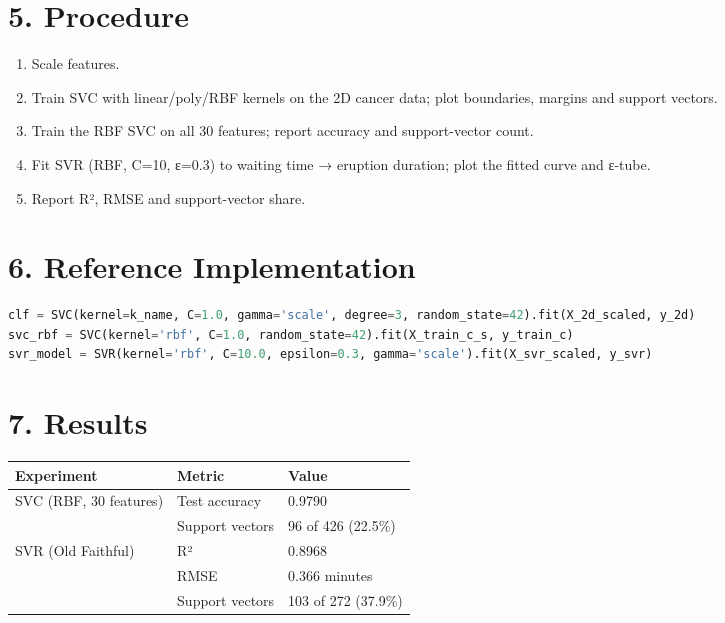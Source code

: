 \section{5. Procedure}\label{procedure}

\begin{enumerate}
\def\labelenumi{\arabic{enumi}.}
\tightlist
\item
  Scale features.
\item
  Train SVC with linear/poly/RBF kernels on the 2D cancer data; plot
  boundaries, margins and support vectors.
\item
  Train the RBF SVC on all 30 features; report accuracy and
  support-vector count.
\item
  Fit SVR (RBF, C=10, ε=0.3) to waiting time → eruption duration; plot
  the fitted curve and ε-tube.
\item
  Report R², RMSE and support-vector share.
\end{enumerate}

\section{6. Reference Implementation}\label{reference-implementation}

\begin{lstlisting}[language=Python]
clf = SVC(kernel=k_name, C=1.0, gamma='scale', degree=3, random_state=42).fit(X_2d_scaled, y_2d)
svc_rbf = SVC(kernel='rbf', C=1.0, random_state=42).fit(X_train_c_s, y_train_c)
svr_model = SVR(kernel='rbf', C=10.0, epsilon=0.3, gamma='scale').fit(X_svr_scaled, y_svr)
\end{lstlisting}

\section{7. Results}\label{results}

{\def\LTcaptype{none} %
\begin{longtable}[]{@{}lll@{}}
\toprule\noalign{}
Experiment & Metric & Value \\
\midrule\noalign{}
\endhead
\bottomrule\noalign{}
\endlastfoot
SVC (RBF, 30 features) & Test accuracy & 0.9790 \\
& Support vectors & 96 of 426 (22.5\%) \\
SVR (Old Faithful) & R² & 0.8968 \\
& RMSE & 0.366 minutes \\
& Support vectors & 103 of 272 (37.9\%) \\
\end{longtable}
}

